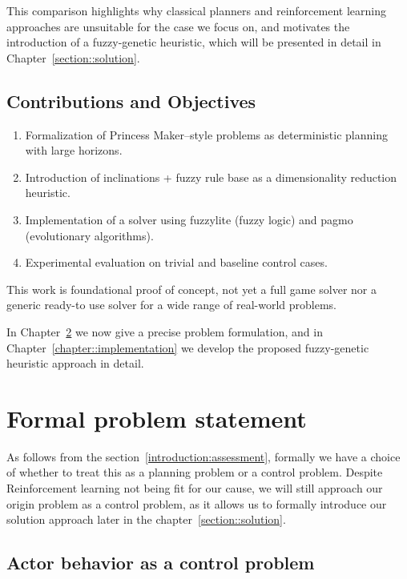 \documentclass[12pt, a4paper]{report}
\begin{document}
This comparison highlights why classical planners and reinforcement learning approaches are unsuitable for the case we focus on, and motivates the introduction of a fuzzy-genetic heuristic, which will be presented in detail in Chapter~\ref{section::solution}.

	
	\section{Contributions and Objectives}
	
		\begin{enumerate}
			\item Formalization of Princess Maker–style problems as deterministic planning with large horizons.
		
			\item Introduction of inclinations + fuzzy rule base as a dimensionality reduction heuristic.
			
			\item Implementation of a solver using fuzzylite (fuzzy logic) and pagmo (evolutionary algorithms).
			
			\item Experimental evaluation on trivial and baseline control cases.
		\end{enumerate}	
		
		This work is foundational proof of concept, not yet a full game solver nor a generic ready-to use solver for a wide range of real-world problems.
		
		In Chapter~\ref{problem-statement} we now give a precise problem formulation, and in Chapter~\ref{chapter::implementation} we develop the proposed fuzzy-genetic heuristic approach in detail.

	
	\chapter{Formal problem statement}\label{problem-statement}

	As follows from the section~\ref{introduction:assessment}, formally we have a choice of whether to treat this as a planning problem or a control problem.
	Despite Reinforcement learning not being fit for our cause, we will still approach our origin problem as a control problem, as it allows us to formally introduce our solution approach later in the chapter~\ref{section::solution}.

	\section{Actor behavior as a control problem}
\end{document}
